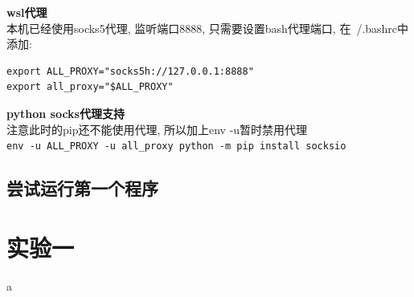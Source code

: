 \documentclass{ctexart}
\begin{document}
\textbf{wsl代理}\\
本机已经使用socks5代理, 监听端口8888, 只需要设置bash代理端口, 在~/.bashrc中添加:
\begin{verbatim}
export ALL_PROXY="socks5h://127.0.0.1:8888"
export all_proxy="$ALL_PROXY"
\end{verbatim}

\textbf{python socks代理支持}\\
注意此时的pip还不能使用代理, 所以加上env -u暂时禁用代理\\
\verb|env -u ALL_PROXY -u all_proxy python -m pip install socksio|

\subsection{尝试运行第一个程序}




\section{实验一}
a
\end{document}
